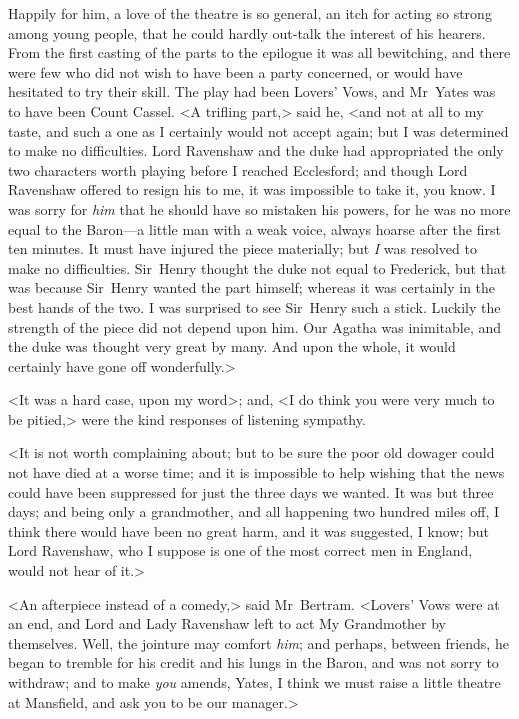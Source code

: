 Happily for him, a love of the theatre is so general, an itch for acting so strong among young people, that he could hardly out-talk the interest of his hearers. From the first casting of the parts to the epilogue it was all bewitching, and there were few who did not wish to have been a party concerned, or would have hesitated to try their skill. The play had been Lovers' Vows, and Mr~Yates was to have been Count Cassel. <A trifling part,> said he, <and not at all to my taste, and such a one as I certainly would not accept again; but I was determined to make no difficulties. Lord Ravenshaw and the duke had appropriated the only two characters worth playing before I reached Ecclesford; and though Lord Ravenshaw offered to resign his to me, it was impossible to take it, you know. I was sorry for \textit{him}  that he should have so mistaken his powers, for he was no more equal to the Baron—a little man with a weak voice, always hoarse after the first ten minutes. It must have injured the piece materially; but \textit{I}  was resolved to make no difficulties. Sir~Henry thought the duke not equal to Frederick, but that was because Sir~Henry wanted the part himself; whereas it was certainly in the best hands of the two. I was surprised to see Sir~Henry such a stick. Luckily the strength of the piece did not depend upon him. Our Agatha was inimitable, and the duke was thought very great by many. And upon the whole, it would certainly have gone off wonderfully.>

<It was a hard case, upon my word>; and, <I do think you were very much to be pitied,> were the kind responses of listening sympathy.

<It is not worth complaining about; but to be sure the poor old dowager could not have died at a worse time; and it is impossible to help wishing that the news could have been suppressed for just the three days we wanted. It was but three days; and being only a grandmother, and all happening two hundred miles off, I think there would have been no great harm, and it was suggested, I know; but Lord Ravenshaw, who I suppose is one of the most correct men in England, would not hear of it.>

<An afterpiece instead of a comedy,> said Mr~Bertram. <Lovers' Vows were at an end, and Lord and Lady Ravenshaw left to act My Grandmother by themselves. Well, the jointure may comfort \textit{him}; and perhaps, between friends, he began to tremble for his credit and his lungs in the Baron, and was not sorry to withdraw; and to make \textit{you}  amends, Yates, I think we must raise a little theatre at Mansfield, and ask you to be our manager.>

